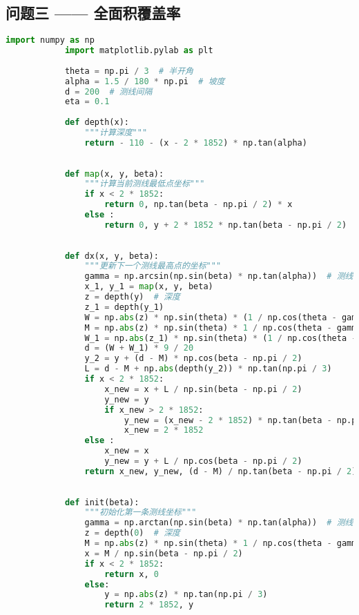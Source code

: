\documentclass[withoutpreface,bwprint]{cumcmthesis} %
\begin{document}
\begin{appendices}
            \section{问题三 —— 全面积覆盖率}
            \begin{lstlisting}[language=python]
            import numpy as np
            import matplotlib.pylab as plt
            
            theta = np.pi / 3  # 半开角
            alpha = 1.5 / 180 * np.pi  # 坡度
            d = 200  # 测线间隔
            eta = 0.1
            
            def depth(x):
                """计算深度"""
                return - 110 - (x - 2 * 1852) * np.tan(alpha)
            
            
            def map(x, y, beta):
                """计算当前测线最低点坐标"""
                if x < 2 * 1852:
                    return 0, np.tan(beta - np.pi / 2) * x
                else :
                    return 0, y + 2 * 1852 * np.tan(beta - np.pi / 2)
            
            
            def dx(x, y, beta):
                """更新下一个测线最高点的坐标"""
                gamma = np.arcsin(np.sin(beta) * np.tan(alpha))  # 测线斜波交线和投影夹角
                x_1, y_1 = map(x, y, beta)
                z = depth(y)  # 深度
                z_1 = depth(y_1)
                W = np.abs(z) * np.sin(theta) * (1 / np.cos(theta - gamma) + 1 / np.cos(theta + gamma)) * np.cos(gamma) # 覆盖宽度
                M = np.abs(z) * np.sin(theta) * 1 / np.cos(theta - gamma) * np.cos(gamma) # 平分线一侧覆盖宽度
                W_1 = np.abs(z_1) * np.sin(theta) * (1 / np.cos(theta - gamma) + 1 / np.cos(theta + gamma)) * np.cos(gamma) # 覆盖宽度
                d = (W + W_1) * 9 / 20
                y_2 = y + (d - M) * np.cos(beta - np.pi / 2)
                L = d - M + np.abs(depth(y_2)) * np.tan(np.pi / 3)
                if x < 2 * 1852:
                    x_new = x + L / np.sin(beta - np.pi / 2) 
                    y_new = y
                    if x_new > 2 * 1852:
                        y_new = (x_new - 2 * 1852) * np.tan(beta - np.pi / 2)
                        x_new = 2 * 1852
                else :
                    x_new = x
                    y_new = y + L / np.cos(beta - np.pi / 2)
                return x_new, y_new, (d - M) / np.tan(beta - np.pi / 2) 
            
            
            def init(beta):
                """初始化第一条测线坐标"""
                gamma = np.arctan(np.sin(beta) * np.tan(alpha))  # 测线斜波交线和投影夹角
                z = depth(0)  # 深度
                M = np.abs(z) * np.sin(theta) * 1 / np.cos(theta - gamma) * np.cos(gamma) # 平分线一侧覆盖宽度
                x = M / np.sin(beta - np.pi / 2)
                if x < 2 * 1852:
                    return x, 0
                else:
                    y = np.abs(z) * np.tan(np.pi / 3)
                    return 2 * 1852, y
                

\end{lstlisting}
\end{appendices}
\end{document}
